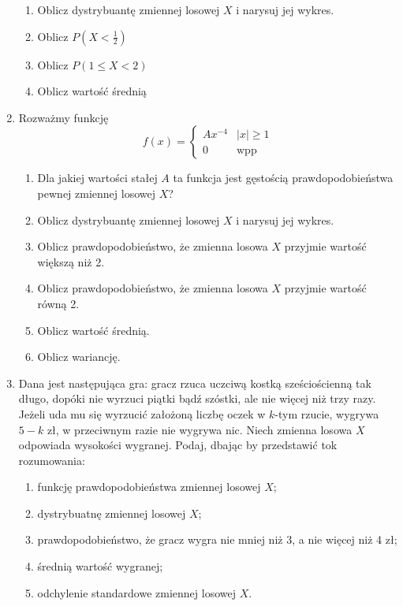 \documentclass{mwart}
\newcommand{\ans}[1]{}
\newcommand{\ans}[1]{\emph{Odpowiedź:} #1}
\begin{document}
\begin{enumerate}
\begin{enumerate}
\item Oblicz dystrybuantę zmiennej losowej $X$ i narysuj jej wykres.
\item Oblicz $P(X<\frac{1}{2})$
\item Oblicz $P(1\leq X<2)$
\item Oblicz wartość średnią
\end{enumerate}
\item Rozważmy funkcję \[f(x)=\begin{cases} Ax^{-4} & \left|x\right|\geq 1 \\ 0 & \text{wpp} \end{cases} \]
\begin{enumerate}
\item Dla jakiej wartości stałej $A$ ta funkcja jest gęstością prawdopodobieństwa pewnej zmiennej losowej $X$? \ans{$\frac{3}{2}$}
\item Oblicz dystrybuantę zmiennej losowej $X$ i narysuj jej wykres. \ans{\[\begin{cases}-\frac{x^{-3}}{2} & x\leq-1\\\frac{1}{2} & -1<x\leq1\\1-\frac{x^{-3}}{2} & x>1 \end{cases}\]}
\item Oblicz prawdopodobieństwo, że zmienna losowa $X$ przyjmie wartość większą niż 2. \ans{$\frac{1}{16}$}
\item Oblicz prawdopodobieństwo, że zmienna losowa $X$ przyjmie wartość równą 2. \ans{$0$}
\item Oblicz wartość średnią. \ans{$0$}
\item Oblicz wariancję. \ans{$3$}
\end{enumerate}
\item Dana jest następująca gra: gracz rzuca uczciwą kostką sześciościenną tak długo, dopóki nie wyrzuci piątki bądź
szóstki, ale nie więcej niż trzy razy. Jeżeli uda mu się wyrzucić założoną liczbę oczek w $k$-tym rzucie, wygrywa $5-k$
zł, w przeciwnym razie nie wygrywa nic. Niech zmienna losowa $X$ odpowiada wysokości wygranej. Podaj, dbając
by przedstawić tok rozumowania:
\begin{enumerate}
\item funkcję prawdopodobieństwa zmiennej losowej $X$;
\item dystrybuatnę zmiennej losowej $X$;
\item prawdopodobieństwo, że gracz wygra nie mniej niż 3, a nie więcej niż 4 zł;
\item średnią wartość wygranej;
\item odchylenie standardowe zmiennej losowej $X$.

\end{enumerate}
\end{enumerate}
\end{document}
